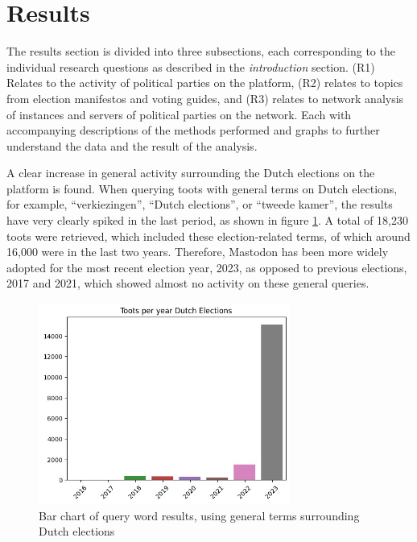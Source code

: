 \section{Results}
The results section is divided into three subsections, each corresponding to the individual research questions as described in the \textit{introduction} section. (R1) Relates to the activity of political parties on the platform, (R2) relates to topics from election manifestos and voting guides, and (R3) relates to network analysis of instances and servers of political parties on the network. Each with accompanying descriptions of the methods performed and graphs to further understand the data and the result of the analysis.

A clear increase in general activity surrounding the Dutch elections on the platform is found.
When querying toots with general terms on Dutch elections, for example, “verkiezingen”, “Dutch elections”, or “tweede kamer”, the results have very clearly spiked in the last period, as shown in figure \ref{fig:electionstotal}. A total of 18,230 toots were retrieved, which included these election-related terms, of which around 16,000 were in the last two years.
Therefore, Mastodon has been more widely adopted for the most recent election year, 2023, as opposed to previous elections, 2017 and 2021, which showed almost no activity on these general queries.

\begin{figure}[ht]
  \centering
  \includegraphics[width=3.25in]{media/dutch-elections-mastodon.jpeg}
  \caption{Bar chart of query word results, using general terms surrounding Dutch elections}
  \label{fig:electionstotal}
\end{figure}

